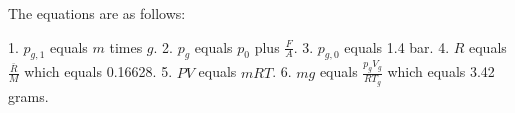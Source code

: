 The equations are as follows:

1. \( p_{g,1} \) equals \( m \) times \( g \).
2. \( p_g \) equals \( p_0 \) plus \( \frac{F}{A} \).
3. \( p_{g,0} \) equals 1.4 bar.
4. \( R \) equals \( \frac{\bar{R}}{M} \) which equals 0.16628.
5. \( PV \) equals \( mRT \).
6. \( mg \) equals \( \frac{p_g V_g}{R T_g} \) which equals 3.42 grams.